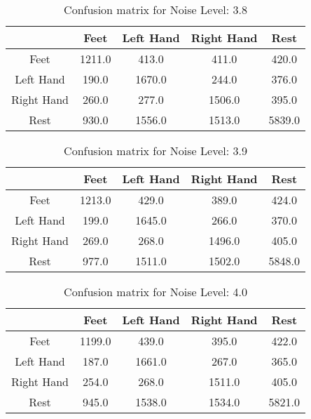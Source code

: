 \begin{table}[!htbp]
    \centering
    \begin{tabular}{|c||c|c|c|c|}
        \hline
		 & Feet & Left Hand & Right Hand & Rest \\
        \hline
        \hline
        Feet & 1211.0 & 413.0 & 411.0 & 420.0 \\
        \hline
        Left Hand & 190.0 & 1670.0 & 244.0 & 376.0 \\
        \hline
        Right Hand & 260.0 & 277.0 & 1506.0 & 395.0 \\
        \hline
        Rest & 930.0 & 1556.0 & 1513.0 & 5839.0 \\
        \hline
    \end{tabular}
    \caption{Confusion matrix for Noise Level: 3.8}
\end{table}

\begin{table}[!htbp]
    \centering
    \begin{tabular}{|c||c|c|c|c|}
        \hline
		 & Feet & Left Hand & Right Hand & Rest \\
        \hline
        \hline
        Feet & 1213.0 & 429.0 & 389.0 & 424.0 \\
        \hline
        Left Hand & 199.0 & 1645.0 & 266.0 & 370.0 \\
        \hline
        Right Hand & 269.0 & 268.0 & 1496.0 & 405.0 \\
        \hline
        Rest & 977.0 & 1511.0 & 1502.0 & 5848.0 \\
        \hline
    \end{tabular}
    \caption{Confusion matrix for Noise Level: 3.9}
\end{table}

\begin{table}[!htbp]
    \centering
    \begin{tabular}{|c||c|c|c|c|}
        \hline
		 & Feet & Left Hand & Right Hand & Rest \\
        \hline
        \hline
        Feet & 1199.0 & 439.0 & 395.0 & 422.0 \\
        \hline
        Left Hand & 187.0 & 1661.0 & 267.0 & 365.0 \\
        \hline
        Right Hand & 254.0 & 268.0 & 1511.0 & 405.0 \\
        \hline
        Rest & 945.0 & 1538.0 & 1534.0 & 5821.0 \\
        \hline
    \end{tabular}
    \caption{Confusion matrix for Noise Level: 4.0}
\end{table}

